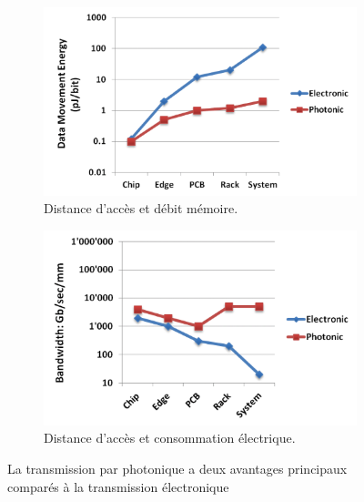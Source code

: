         
        \begin{figure}[t!]
            \centering
            \begin{subfigure}[t]{0.48\textwidth}
                \centering
                \includegraphics[width=\linewidth]{images/edl_photo_pj.png}
                \caption{\label{fig:edl_photo_pj} Distance d'accès et débit mémoire.}
            \end{subfigure}\hfill
            \begin{subfigure}[t]{0.48\textwidth}
                \centering
                \includegraphics[width=\linewidth]{images/edl_photo_bw.png}
                \caption{\label{fig:edl_photo_bw} Distance d'accès et consommation électrique.}
            \end{subfigure}
            \caption{\label{fig:edl_photo} La transmission par photonique a deux avantages principaux comparés à la transmission électronique\cite{Lucas2014}}
        \end{figure}
    
